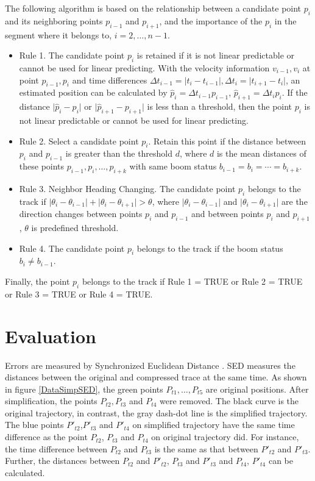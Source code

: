 The following algorithm is based on the relationship between a candidate point $p_i$ and its neighboring points $p_{i-1}$ and $p_{i+1}$, and the importance of the $p_i$ in the segment where it belongs to, $i=2,\ldots,n-1$. 

\begin{itemize}
\item Rule 1. The candidate point $p_i$ is retained if it is not linear predictable or cannot be used for linear predicting. With the velocity information $v_{i-1}, v_i$ at point $p_{i-1}, p_i$ and time differences $\Delta t_{i-1} = \lvert t_{i}-t_{i-1} \rvert,\Delta t_{i} = \lvert t_{i+1}-t_{i}\rvert$, an estimated position can be calculated by $\hat{p}_i=\Delta t_{i-1} p_{i-1}$, $\hat{p}_{i+1}=\Delta t_{i} p_{i}$. If the distance $\lvert \hat{p}_i-p_i\rvert$ or $\lvert \hat{p}_{i+1}-p_{i+1}\rvert$ is less than a threshold, then the point $p_i$ is not linear predictable or cannot be used for linear predicting.

\item Rule 2. Select a candidate point $p_i$. Retain this point if the distance between $p_i$ and $p_{i-1}$ is greater than the threshold $d$, where $d$ is the mean distances of these points $p_{i-1}, p_i, \ldots, p_{i+k}$ with same boom status $b_{i-1}=b_i=\cdots=b_{i+k}$. 

\item Rule 3. Neighbor Heading Changing. The candidate point $p_i$ belongs to the track if $\lvert \theta_i-\theta_{i-1}\rvert  + \lvert \theta_i-\theta_{i+1}\rvert >\theta$, where $\lvert \theta_i-\theta_{i-1}\rvert$ and $ \lvert \theta_i-\theta_{i+1}\rvert $ are the direction changes between points $p_i$ and $p_{i-1}$ and between points $p_i$ and $p_{i+1}$, $\theta$ is predefined threshold.

\item Rule 4. The candidate point $p_i$ belongs to the track if the boom status $b_i\neq b_{i-1}$.
\end{itemize}

Finally, the point $p_i$ belongs to the track if Rule 1 = TRUE or Rule 2 = TRUE or Rule 3 = TRUE or Rule 4 = TRUE.


\section{Evaluation}

Errors are measured by Synchronized Euclidean Distance \cite{lawson2011compression}. SED measures the distances between the original and compressed trace at the same time. As shown in figure \ref{DataSimpSED}, the green points $P_{t1}, \ldots ,P_{t5}$ are original positions. After simplification, the points $P_{t2}, P_{t3}$ and $P_{t4}$ were removed. The black curve is the original trajectory, in contrast, the gray dash-dot line is the simplified trajectory. The blue points $P'_{t2}$,$P'_{t3}$ and $P'_{t4}$ on simplified trajectory have the same time difference as the point $P_{t2}$, $P_{t3}$ and $P_{t4}$ on original trajectory did. For instance, the time difference between $P_{t2}$ and $P_{t3}$ is the same as that between $P'_{t2}$ and $P'_{t3}$. Further, the distances between $P_{t2}$ and $P'_{t2}$, $P_{t3}$ and $P'_{t3}$ and $P_{t4}$, $P'_{t4}$ can be calculated.



